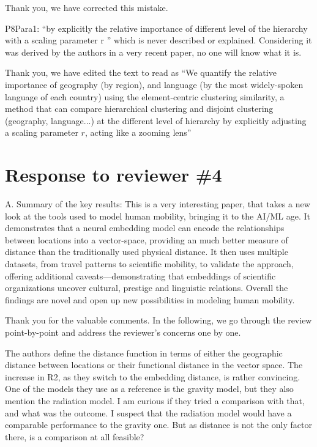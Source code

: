 \documentclass[12pt,a4paper]{article}
\newcommand{\response}[1]{{\leavevmode\noindent #1}}
\newcommand{\rcomment}[1]{%
\vspace{10pt}
\begin{tcolorbox}[colback=black!3,colframe=white!45!black]
#1
\end{tcolorbox}
}
\begin{document}
\response{
Thank you, we have corrected this mistake. 
}

\rcomment{
P8Para1: “by explicitly the relative importance of different level of the hierarchy with a scaling parameter r ” which is never described or explained. Considering it was derived by the authors in a very recent paper, no one will know what it is.
}

\response{
Thank you, we have edited the text to read as “We quantify the relative importance of geography (by region), and language (by the most widely-spoken language of each country) using the element-centric clustering similarity, a method that can compare hierarchical clustering and disjoint clustering (geography, language...) at the different level of hierarchy by explicitly adjusting a scaling parameter $r$, acting like a zooming lens”
}



\section*{Response to reviewer \#4}

\rcomment{%
A. Summary of the key results:
This is a very interesting paper, that takes a new look at the tools used to model human mobility, bringing it to the AI/ML age. It demonstrates that a neural embedding model can encode the relationships between locations into a vector-space, providing an much better measure of distance than the traditionally used physical distance. It then uses multiple datasets, from travel patterns to scientific mobility, to validate the approach, offering additional caveats—demonstrating that embeddings of scientific organizations uncover cultural, prestige and linguistic relations. Overall the findings are novel and open up new possibilities in modeling human mobility.
}

\response{%
Thank you for the valuable comments. 
In the following, we go through the review point-by-point and address the reviewer's concerns one by one.
}

\rcomment{
The authors define the distance function in terms of either the geographic distance between locations or their functional distance in the vector space. The increase in R2, as they switch to the embedding distance, is rather convincing. One of the models they use as a reference is the gravity model, but they also mention the radiation model. I am curious if they tried a comparison with that, and what was the outcome. I suspect that the radiation model would have a comparable performance to the gravity one. But as distance is not the only factor there, is a comparison at all feasible?
}
\end{document}

